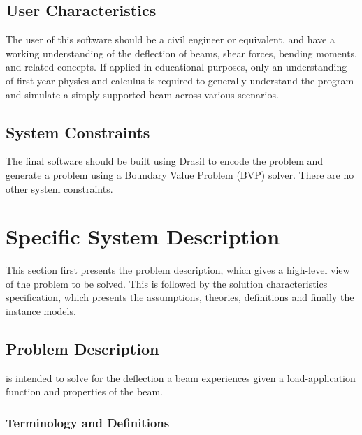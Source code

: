 \documentclass[12pt]{article}
\begin{document}
\subsection{User Characteristics} \label{SecUserCharacteristics}

The user of this software should be a civil engineer or equivalent, and have a
working understanding of the deflection of beams, shear forces, bending moments,
and related concepts. If applied in educational purposes, only an understanding
of first-year physics and calculus is required to generally understand the
program and simulate a simply-supported beam across various scenarios.

\subsection{System Constraints}

The final software should be built using Drasil to encode the problem and
generate a problem using a Boundary Value Problem (BVP) solver. There are no
other system constraints.

\newpage


\section{Specific System Description} \label{sec_ssd}

This section first presents the problem description, which gives a high-level
view of the problem to be solved.  This is followed by the solution characteristics
specification, which presents the assumptions, theories, definitions and finally
the instance models.  

\subsection{Problem Description} \label{Sec_pd}

\progname{} is intended to solve for the deflection a beam experiences given a
load-application function and properties of the beam.

\subsubsection{Terminology and  Definitions}
\end{document}
